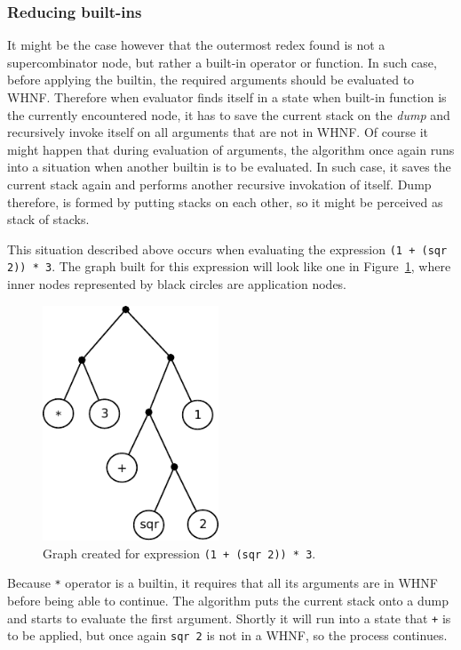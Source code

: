 \documentclass[12pt,a4paper]{report}
\begin{document}
\subsubsection{Reducing built-ins}
It might be the case however that the outermost redex found is not a
supercombinator node, but rather a built-in operator or function. In such case,
before applying the builtin, the required arguments should be evaluated to
WHNF. Therefore when evaluator finds itself in a state when built-in function
is the currently encountered node, it has to save the current stack on the
\textit{dump} and recursively invoke itself on all arguments that are not in
WHNF. Of course it might happen that during evaluation of arguments, the
algorithm once again runs into a situation when another builtin is to be
evaluated. In such case, it saves the current stack again and performs another
recursive invokation of itself. Dump therefore, is formed by putting stacks on
each other, so it might be perceived as stack of stacks.

This situation described above occurs when evaluating the expression \texttt{(1
+ (sqr 2)) * 3}. The graph built for this expression will look like one in
Figure~\ref{fig:expression_graph}, where inner nodes represented by black
circles are application nodes.

\vspace*{0.2in}
\begin{figure}[h!]
  \centering
  \includegraphics[height=7cm]{gmachine_graph}
  \caption{Graph created for expression \texttt{(1 + (sqr 2)) * 3}.}
  \label{fig:expression_graph}
\end{figure}

Because \texttt{*} operator is a builtin, it requires that all its arguments
are in WHNF before being able to continue. The algorithm puts the current stack
onto a dump and starts to evaluate the first argument. Shortly it will run into
a state that \texttt{+} is to be applied, but once again \texttt{sqr 2} is not
in a WHNF, so the process continues.
\end{document}
